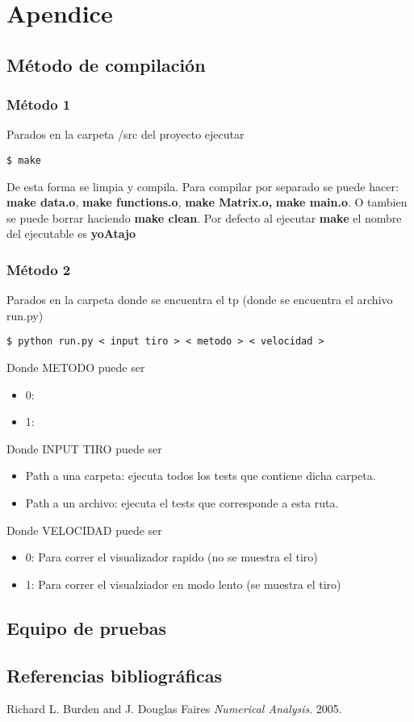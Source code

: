 \section{Apendice}

\subsection{M\'etodo de compilaci\'on}

\subsubsection{M\'etodo 1}
\begin{framed}
Parados en la carpeta /src del proyecto ejecutar 
\begin{verbatim}
$ make
\end{verbatim}
De esta forma se limpia y compila.
Para compilar por separado se puede hacer:  \textbf{make data.o}, \textbf{make functions.o}, \textbf{make Matrix.o,} \textbf{make main.o}. O tambien se puede borrar haciendo \textbf{make clean}. Por defecto al ejecutar \textbf{make} el nombre del ejecutable es \textbf{yoAtajo}
\end{framed}

\subsubsection{M\'etodo 2}
\begin{framed}
Parados en la carpeta donde se encuentra el tp (donde se encuentra el archivo run.py)
\begin{verbatim}
$ python run.py < input tiro > < metodo > < velocidad > 
\end{verbatim}
Donde METODO puede ser 
\begin{itemize}
	\item 0: 
	\item 1: 
\end{itemize}

Donde INPUT TIRO puede ser 
\begin{itemize}
	\item Path a una carpeta: ejecuta todos los tests que contiene dicha carpeta.
	\item Path a un archivo: ejecuta el tests que corresponde a esta ruta.
\end{itemize}

Donde VELOCIDAD puede ser 
\begin{itemize}
	\item 0: Para correr el visualizador rapido (no se muestra el tiro)
	\item 1: Para correr el visualziador en modo lento (se muestra el tiro)
\end{itemize}
\end{framed}



\subsection{Equipo de pruebas}
\subsection{Referencias bibliogr\'aficas}
\begin{thebibliography}{9}

  Richard L. Burden and J. Douglas Faires
  \emph{Numerical Analysis}.
  2005.
\end{thebibliography}
